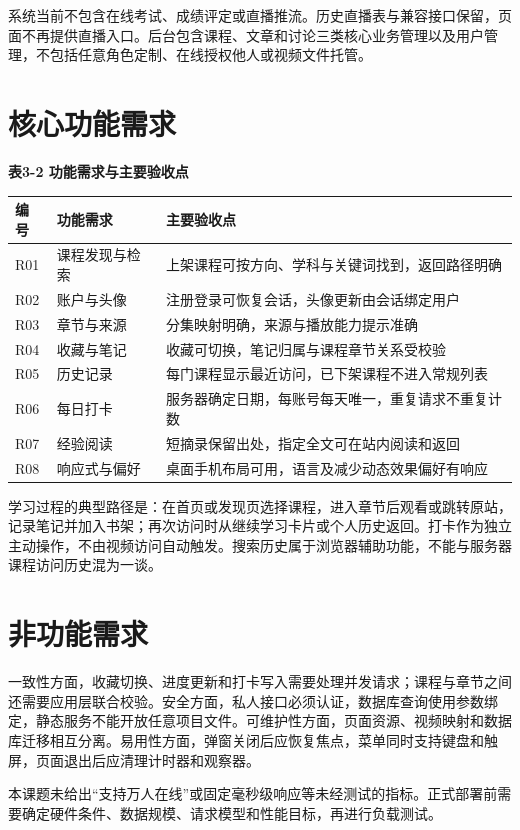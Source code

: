 \documentclass[UTF8,12pt,a4paper,oneside,openany]{ctexbook}
\begin{document}
系统当前不包含在线考试、成绩评定或直播推流。历史直播表与兼容接口保留，页面不再提供直播入口。后台包含课程、文章和讨论三类核心业务管理以及用户管理，不包括任意角色定制、在线授权他人或视频文件托管。


\section{核心功能需求}


\noindent\textbf{表3-2 功能需求与主要验收点}

{\small
\begin{longtable}{P{0.32\textwidth}P{0.24\textwidth}P{0.32\textwidth}}
\toprule
编号 & 功能需求 & 主要验收点 \\
\midrule
\endhead
R01 & 课程发现与检索 & 上架课程可按方向、学科与关键词找到，返回路径明确 \\
R02 & 账户与头像 & 注册登录可恢复会话，头像更新由会话绑定用户 \\
R03 & 章节与来源 & 分集映射明确，来源与播放能力提示准确 \\
R04 & 收藏与笔记 & 收藏可切换，笔记归属与课程章节关系受校验 \\
R05 & 历史记录 & 每门课程显示最近访问，已下架课程不进入常规列表 \\
R06 & 每日打卡 & 服务器确定日期，每账号每天唯一，重复请求不重复计数 \\
R07 & 经验阅读 & 短摘录保留出处，指定全文可在站内阅读和返回 \\
R08 & 响应式与偏好 & 桌面手机布局可用，语言及减少动态效果偏好有响应 \\
\bottomrule
\end{longtable}}

学习过程的典型路径是：在首页或发现页选择课程，进入章节后观看或跳转原站，记录笔记并加入书架；再次访问时从继续学习卡片或个人历史返回。打卡作为独立主动操作，不由视频访问自动触发。搜索历史属于浏览器辅助功能，不能与服务器课程访问历史混为一谈。


\section{非功能需求}

一致性方面，收藏切换、进度更新和打卡写入需要处理并发请求；课程与章节之间还需要应用层联合校验。安全方面，私人接口必须认证，数据库查询使用参数绑定，静态服务不能开放任意项目文件。可维护性方面，页面资源、视频映射和数据库迁移相互分离。易用性方面，弹窗关闭后应恢复焦点，菜单同时支持键盘和触屏，页面退出后应清理计时器和观察器。


本课题未给出“支持万人在线”或固定毫秒级响应等未经测试的指标。正式部署前需要确定硬件条件、数据规模、请求模型和性能目标，再进行负载测试。
\end{document}
